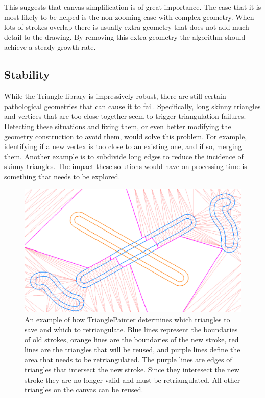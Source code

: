 \documentclass[review]{acmsiggraph}
\begin{document}
This suggests that canvas simplification is of great importance.
The case that it is most likely to be helped is the non-zooming case with complex geometry. When lots of strokes
overlap there is usually extra geometry that does not add much detail to the drawing. By removing
this extra geometry the algorithm should achieve a steady growth rate.

\subsection{Stability}
While the Triangle library is impressively robust, there are still certain pathological geometries that can cause it to fail.  Specifically, long skinny triangles and vertices that are too close together seem to trigger triangulation failures.  Detecting these situations and fixing them, or even better modifying the geometry construction to avoid them, would solve this problem.  For example, identifying if a new vertex is too close to an existing one, and if so, merging them.  Another example is to subdivide long edges to reduce the incidence of skinny triangles.  The impact these solutions would have on processing time is something that needs to be explored.

\begin{figure}
    \centering
        \includegraphics[width=\columnwidth]{images/grid}
    \caption{An example of how TrianglePainter determines which triangles to save and which to retriangulate. Blue
    lines represent the boundaries of old strokes, orange lines are the boundaries of the new stroke, red lines are
    the triangles that will be reused, and purple lines define the area that needs to be retriangulated. The purple
    lines are edges of triangles that intersect the new stroke. Since they interesect the new stroke they are no
    longer valid and must be retriangulated. All other triangles on the canvas can be reused.}
    \label{fig:modified}
\end{figure}
\end{document}
